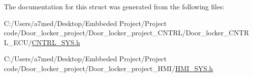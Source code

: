 The documentation for this struct was generated from the following files\+:\begin{DoxyCompactItemize}
\item 
C\+:/\+Users/a7med/\+Desktop/\+Embbeded Project/\+Project code/\+Door\+\_\+locker\+\_\+project/\+Door\+\_\+locker\+\_\+project\+\_\+\+C\+N\+T\+R\+L/\+Door\+\_\+locker\+\_\+\+C\+N\+T\+R\+L\+\_\+\+E\+C\+U/\hyperlink{_c_n_t_r_l___s_y_s_8h}{C\+N\+T\+R\+L\+\_\+\+S\+Y\+S.\+h}\item 
C\+:/\+Users/a7med/\+Desktop/\+Embbeded Project/\+Project code/\+Door\+\_\+locker\+\_\+project/\+Door\+\_\+locker\+\_\+project\+\_\+\+H\+M\+I/\hyperlink{_h_m_i___s_y_s_8h}{H\+M\+I\+\_\+\+S\+Y\+S.\+h}\end{DoxyCompactItemize}
